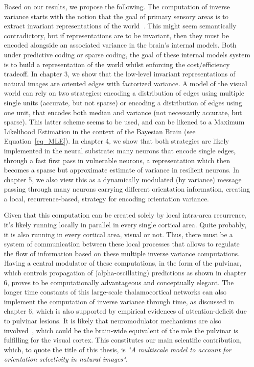 Based on our results, we propose the following. The computation of inverse variance starts with the notion that the goal of primary sensory areas is to extract invariant representations of the world~\cite{keller2018predictive, barlow1961possible}. This might seem semantically contradictory, but if representations are to be invariant, then they must be encoded alongside an associated variance in the brain's internal models. Both under predictive coding or sparse coding, the goal of these internal models system is to build a representation of the world whilst enforcing the cost/efficiency tradeoff. In chapter 3, we show that the low-level invariant representations of natural images are oriented edges with factorized variance. A model of the visual world can rely on two strategies: encoding a distribution of edges using multiple single units (accurate, but not sparse) or encoding a distribution of edges using one unit, that encodes both median and variance (not necessarily accurate, but sparse). This latter scheme seems to be used, and can be likened to a Maximum Likelihood Estimation in the context of the Bayesian Brain (see Equation~\ref{eq_MLE}). In chapter 4, we show that both strategies are likely implemented in the neural substrate: many neurons that encode single edges, through a fast first pass in vulnerable neurons, a representation which then becomes a sparse but approximate estimate of variance in resilient neurons. In chapter 5, we also view this as a dynamically modulated (by variance) message passing through many neurons carrying different orientation information, creating a local, recurrence-based, strategy for encoding orientation variance.

Given that this computation can be created solely by local intra-area recurrence, it's likely running locally in parallel in every single cortical area. Quite probably, it is also running in every cortical area, visual or not. Thus, there must be a system of communication between these local processes that allows to regulate the flow of information based on these multiple inverse variance computations. Having a central modulator of these computations, in the form of the pulvinar, which controls propagation of (alpha-oscillating) predictions as shown in chapter 6, proves to be computationally advantageous and conceptually elegant. The longer time constants of this large-scale thalamocortical networks can also implement the computation of inverse variance through time, as discussed in chapter 6, which is also supported by empirical evidences of attention-deficit due to pulvinar lesions. It is likely that neuromodulator mechanisms are also involved~\cite{moran2013free}, which could be the brain-wide equivalent of the role the pulvinar is fulfilling for the visual cortex.
This constitutes our main scientific contribution, which, to quote the title of this thesis, is \textit{"A multiscale model to account for orientation selectivity in natural images"}.%

